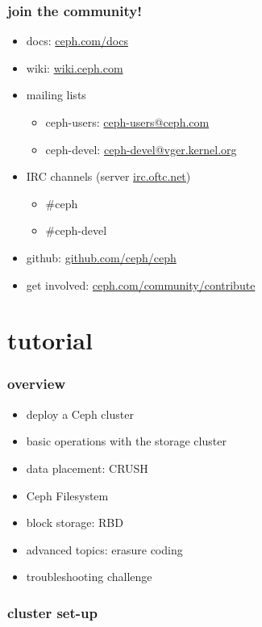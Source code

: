 \documentclass[10pt, compress]{beamer}
\begin{document}
\begin{frame}[fragile]
    \frametitle{join the community!}
    \begin{itemize}
        \item docs: \href{http://docs.ceph.com/docs/master/}{ceph.com/docs}
        \item wiki:
        \href{http://tracker.ceph.com/projects/ceph/wiki/}{wiki.ceph.com}
        \item mailing lists
            \begin{itemize}
                \item ceph-users: 
                \href{mailto:ceph-users@ceph.com}{ceph-users@ceph.com}
                \item ceph-devel: 
            \href{mailto:ceph-devel@vger.kernel.org}{ceph-devel@vger.kernel.org}
            \end{itemize}
        \item IRC channels (server \href{https://www.oftc.net}{irc.oftc.net})
            \begin{itemize}
                \item \#ceph
                \item \#ceph-devel
            \end{itemize}
        \item github: \href{https://github.com/ceph/ceph}{github.com/ceph/ceph}
        \item get involved: 
        \href{http://ceph.com/community/contribute/}{ceph.com/community/contribute}
    \end{itemize}
\end{frame}

\section{tutorial}
\begin{frame}[fragile]
    \frametitle{overview}
    \begin{itemize}
        \item deploy a Ceph cluster
        \item basic operations with the storage cluster
        \item data placement: CRUSH
        \item Ceph Filesystem
        \item block storage: RBD
        \item advanced topics: erasure coding
        \item troubleshooting challenge
    \end{itemize}
\end{frame}

\begin{frame}[fragile]
    \frametitle{cluster set-up}
    \begin{center}
        
    \end{center}
\end{frame}

\end{document}
